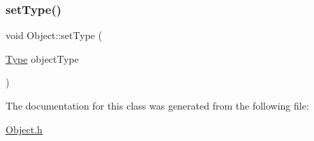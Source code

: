 \mbox{\label{classObject_a1fad7c569e1a3dbd84b97136825bb1dd}} 
\subsubsection{\texorpdfstring{set\+Type()}{setType()}}
{\footnotesize\ttfamily void Object\+::set\+Type (\begin{DoxyParamCaption}\item[{\hyperlink{classObject_ad8dadb365053c182931671a424199e36}{Type}}]{object\+Type }\end{DoxyParamCaption})\hspace{0.3cm}{\ttfamily [inline]}}



The documentation for this class was generated from the following file\+:\begin{DoxyCompactItemize}
\item 
\hyperlink{Object_8h}{Object.\+h}\end{DoxyCompactItemize}
